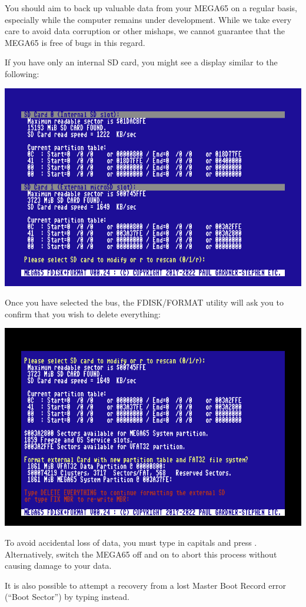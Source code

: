 You should aim to back up valuable data from your
MEGA65 on a regular basis, especially while the computer remains under
development.  While we take every care to avoid data corruption or
other mishaps, we cannot guarantee that the MEGA65 is free of bugs in
this regard.

If you have only an internal SD card, you might see a
display similar to the following:

\begin{center}
\includegraphics[trim= 10mm  7mm 10mm 10mm,clip,width=0.7\linewidth]{images/ss-m65fdisk-busselect.png}
\end{center}

Once you have selected the bus, the FDISK/FORMAT utility will ask you to confirm that you wish to delete everything:

\begin{center}
\includegraphics[trim= 10mm  7mm 10mm 15mm,clip,width=0.7\linewidth]{images/ss-m65fdisk-typesomething.png}
\end{center}

To avoid accidental loss of data, you must type  in capitals and press . Alternatively, switch the MEGA65 off and on to abort this process without causing damage to your data.

It is also possible to attempt a recovery from a lost Master Boot Record error (``Boot Sector'') by typing  instead.

